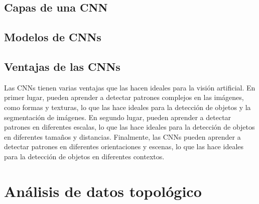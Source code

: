 \subsection{Capas de una CNN}

\subsection{Modelos de CNNs}

\subsection{Ventajas de las CNNs}

Las CNNs tienen varias ventajas que las hacen ideales para la visión artificial. En primer lugar, pueden aprender a detectar patrones complejos en las imágenes, como formas y texturas, lo que las hace ideales para la detección de objetos y la segmentación de imágenes. En segundo lugar, pueden aprender a detectar patrones en diferentes escalas, lo que las hace ideales para la detección de objetos en diferentes tamaños y distancias. Finalmente, las CNNs pueden aprender a detectar patrones en diferentes orientaciones y escenas, lo que las hace ideales para la detección de objetos en diferentes contextos.


\section{Análisis de datos topológico}

\endinput
